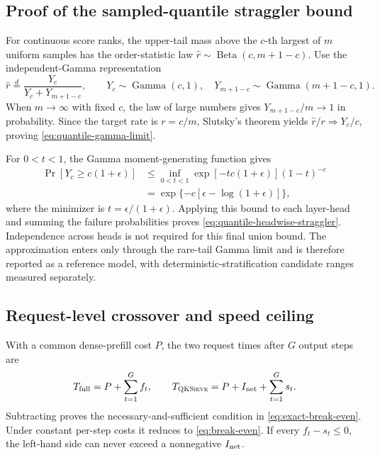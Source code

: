 \subsection{Proof of the sampled-quantile straggler bound}

For continuous score ranks, the upper-tail mass above the $c$-th largest of
$m$ uniform samples has the order-statistic law
$\widehat r\sim\operatorname{Beta}(c,m+1-c)$.
Use the independent-Gamma representation
\begin{equation}
 \widehat r\overset{d}{=}\frac{Y_c}{Y_c+Y_{m+1-c}},
 \qquad
 Y_c\sim\operatorname{Gamma}(c,1),\quad
 Y_{m+1-c}\sim\operatorname{Gamma}(m+1-c,1).
\end{equation}
When $m\to\infty$ with fixed $c$, the law of large numbers gives
$Y_{m+1-c}/m\to1$ in probability.  Since the target rate is
$r=c/m$, Slutsky's theorem yields
$\widehat r/r\Rightarrow Y_c/c$, proving
\cref{eq:quantile-gamma-limit}.

For $0<t<1$, the Gamma moment-generating function gives
\begin{align}
 \Pr[Y_c\ge c(1+\epsilon)]
 &\le
 \inf_{0<t<1}
 \exp[-tc(1+\epsilon)](1-t)^{-c}\\
 &=\exp\{-c[\epsilon-\log(1+\epsilon)]\},
\end{align}
where the minimizer is $t=\epsilon/(1+\epsilon)$.
Applying this bound to each layer-head and summing the failure probabilities
proves \cref{eq:quantile-headwise-straggler}.  Independence across heads is
not required for this final union bound.  The approximation enters only
through the rare-tail Gamma limit and is therefore reported as a reference
model, with deterministic-stratification candidate ranges measured
separately.

\subsection{Request-level crossover and speed ceiling}

With a common dense-prefill cost $P$, the two request times after $G$ output
steps are
\begin{equation}
 T_{\rm full}=P+\sum_{t=1}^{G}f_t,\qquad
 T_{\textsc{QKSieve}}=P+I_{\rm net}+\sum_{t=1}^{G}s_t.
\end{equation}
Subtracting proves the necessary-and-sufficient condition in
\cref{eq:exact-break-even}.  Under constant per-step costs it reduces to
\cref{eq:break-even}.  If every $f_t-s_t\le0$, the left-hand side can never
exceed a nonnegative $I_{\rm net}$.

